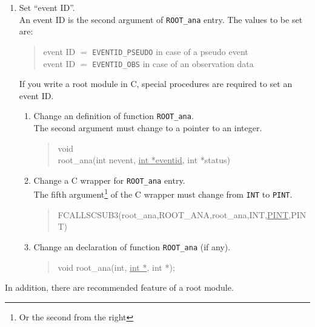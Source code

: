 \begin{enumerate}
\item Set ``event ID''. \\
  An event ID is the second argument of {\tt ROOT\_ana} entry.
  The values to be set are:
  \begin{quote}
  event ID $=$ {\tt EVENTID\_PSEUDO} in case of a pseudo event \\
  event ID $=$ {\tt EVENTID\_OBS} in case of an observation data
  \end{quote}
  If you write a root module in C,
  special procedures are required to set an event ID.
  \begin{enumerate}
    \item Change an definition of function {\tt ROOT\_ana}. \\
          The second argument must change to a pointer to an integer.
         \begin{quote}\baselineskip 3.2mm\begin{tt}
          void \\
          root\_ana(int nevent, \underline{int *eventid}, int *status)
         \end{tt}\end{quote}
    \item Change a C wrapper for {\tt ROOT\_ana} entry. \\
          The fifth argument\footnote{Or the second from the right}
          of the C wrapper must change from {\tt INT} to {\tt PINT}.
         \begin{quote}\baselineskip 3.2mm\begin{tt}
         FCALLSCSUB3(root\_ana,ROOT\_ANA,root\_ana,INT,\underline{PINT},PINT)
         \end{tt}\end{quote}
    \item Change an declaration of function {\tt ROOT\_ana} (if any). \\
         \begin{quote}\baselineskip 3.2mm\begin{tt}
          void root\_ana(int, \underline{int *}, int *);
         \end{tt}\end{quote}
  \end{enumerate}
\end{enumerate}

In addition,
there are recommended feature of a root module.

